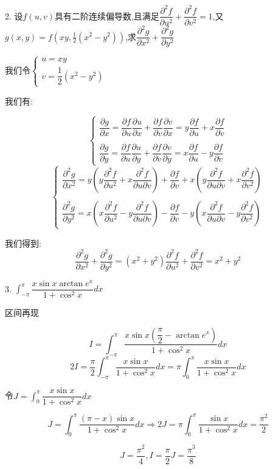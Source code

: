 2. 设$f(u,v)$具有二阶连续偏导数,且满足$\dfrac{\partial^2 f}{\partial u^2}+\dfrac{\partial^2 f}{\partial v^2}=1$,又$g(x,y)=f(xy,\frac{1}{2}(x^2-y^2))$,求$\dfrac{\partial^2 g}{\partial x^2}+\dfrac{\partial^2 g}{\partial y^2}$
\begin{solution}
	
	我们令$\left\lbrace 
	\begin{array}{l}
		u=xy\\
		v=\dfrac{1}{2}(x^2-y^2)
	\end{array}
	\right. $
	
	我们有: 
	
	$$\left\lbrace 
	\begin{array}{l}
		\dfrac{\partial g}{\partial x}=\dfrac{\partial f}{\partial u}\dfrac{\partial u}{\partial x}+\dfrac{\partial f}{\partial v}\dfrac{\partial v}{\partial x}=y\dfrac{\partial f}{\partial u}+x\dfrac{\partial f}{\partial v}\\
		
		\\
		\dfrac{\partial g}{\partial y}=\dfrac{\partial f}{\partial u}\dfrac{\partial u}{\partial y}+\dfrac{\partial f}{\partial v}\dfrac{\partial v}{\partial y}=x\dfrac{\partial f}{\partial u}-y\dfrac{\partial f}{\partial v}
	\end{array}
	\right. $$
	$$\left\lbrace 
	\begin{array}{l}
		\dfrac{\partial^2 g}{\partial x^2}=y(y\dfrac{\partial^2 f}{\partial u^2}+x\dfrac{\partial^2 f}{\partial u\partial v})+\dfrac{\partial f}{\partial v}+x(y\dfrac{\partial^2 f}{\partial u\partial v}+x\dfrac{\partial^2 f}{\partial v^2})\\
		
		\\
		\dfrac{\partial^2 g}{\partial y^2}=x(x\dfrac{\partial^2 f}{\partial u^2}-y\dfrac{\partial^2 f}{\partial u\partial v})-\dfrac{\partial f}{\partial v}-y(x\dfrac{\partial^2 f}{\partial u\partial v}-y\dfrac{\partial^2 f}{\partial v^2})
	\end{array}
	\right. $$
	
	我们得到: 
	$$\dfrac{\partial^2 g}{\partial x^2}+\dfrac{\partial^2 g}{\partial y^2}=(x^2+y^2)\dfrac{\partial^2 f}{\partial u^2}+\dfrac{\partial^2 f}{\partial v^2}=x^2+y^2$$
\end{solution}


3. $\int_{-\pi}^{\pi}\dfrac{x\sin x\arctan e^{x}}{1+\cos ^2 x}dx$
\begin{solution}
	
	区间再现
	
	$$I=\int_{-\pi}^{\pi}\dfrac{x\sin x(\dfrac{\pi}{2}-\arctan e^{x})}{1+\cos ^2 x}dx$$
	$$2I=\dfrac{\pi}{2}\int_{-\pi}^{\pi}\dfrac{x\sin x}{1+\cos ^2 x}dx=\pi\int_{0}^{\pi}\dfrac{x\sin x}{1+\cos ^2 x}dx$$
	
	令$J=\int_{0}^{\pi}\dfrac{x\sin x}{1+\cos ^2 x}dx$
	
	$$J=\int_{0}^{\pi}\dfrac{(\pi-x)\sin x}{1+\cos ^2 x}dx\Rightarrow 2J=\pi\int_{0}^{\pi}\dfrac{\sin x}{1+\cos ^2 x}dx=\dfrac{\pi^2}{2}$$
	
	$$J=\dfrac{\pi^2}{4},I=\dfrac{\pi}{2}J=\dfrac{\pi^3}{8}$$
\end{solution}

